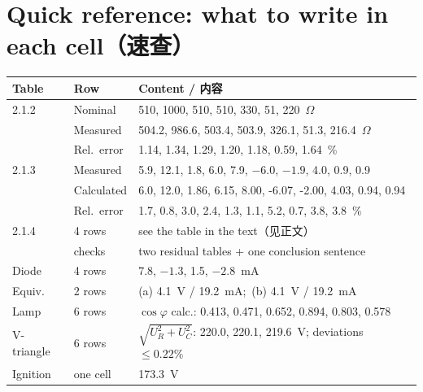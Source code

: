 \documentclass[UTF8,a4paper,10.5pt]{ctexart}
\begin{document}
\newpage
\appendix
\section{Quick reference: what to write in each cell（速查）}
\begin{center}
\footnotesize\setlength{\tabcolsep}{3pt}
\begin{tabularx}{\linewidth}{@{}p{2.2cm}p{2.3cm}X@{}}
\toprule
Table & Row & Content / 内容\\
\midrule
2.1.2 & Nominal & 510, 1000, 510, 510, 330, 51, 220~$\Omega$\\
 & Measured & 504.2, 986.6, 503.4, 503.9, 326.1, 51.3, 216.4~$\Omega$\\
 & Rel.\ error & 1.14, 1.34, 1.29, 1.20, 1.18, 0.59, 1.64~\%\\
\midrule
2.1.3 & Measured & 5.9, 12.1, 1.8, 6.0, 7.9, $-6.0$, $-1.9$, 4.0, 0.9, 0.9\\
 & Calculated & 6.0, 12.0, 1.86, 6.15, 8.00, -6.07, -2.00, 4.03, 0.94, 0.94\\
 & Rel.\ error & 1.7, 0.8, 3.0, 2.4, 1.3, 1.1, 5.2, 0.7, 3.8, 3.8~\%\\
\midrule
2.1.4 & 4 rows & see the table in the text（见正文）\\
 & checks & two residual tables + one conclusion sentence\\
\midrule
Diode & 4 rows & 7.8, $-1.3$, 1.5, $-2.8$~mA\\
\midrule
Equiv. & 2 rows & (a) 4.1~V / 19.2~mA;\ (b) 4.1~V / 19.2~mA\\
\midrule
Lamp & 6 rows & $\cos\varphi$ calc.: 0.413, 0.471, 0.652, 0.894, 0.803, 0.578\\
\midrule
V-triangle & 6 rows & $\sqrt{U_R^2+U_C^2}$: 220.0, 220.1, 219.6~V; deviations $\le0.22\%$\\
\midrule
Ignition & one cell & 173.3~V\\
\bottomrule
\end{tabularx}
\end{center}
\end{document}
